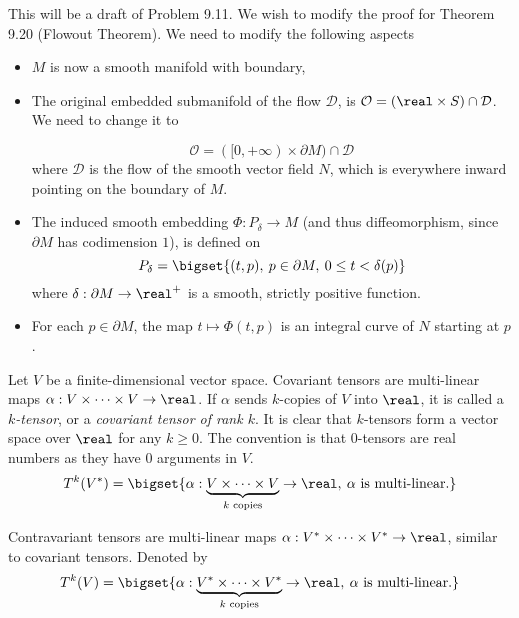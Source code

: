 \documentclass[../main-v2-manifolds.tex]{subfiles}
\begin{document}
This will be a draft of Problem 9.11. We wish to modify the proof for Theorem 9.20 (Flowout Theorem). We need to modify the following aspects
\begin{itemize}
    \item $M$ is now a smooth manifold with boundary,
    \item The original embedded submanifold of the flow $\mathcal{D}$, is $\mathcal{O} = (\real\times S)\cap \mathcal{D}$. We need to change it to

    \[
        \mathcal{O} = ([0,+\infty)\times \partial M)\cap \mathcal{D}
    \]
    where $\mathcal{D}$ is the flow of the smooth vector field $N$, which is everywhere inward pointing on the boundary of $M$.
    \item The induced smooth embedding $\Phi: P_\delta\to M$ (and thus diffeomorphism, since $\partial M$ has codimension $1$), is defined on 
    \[
        P_\delta = \bigset{(t,p),\: p\in\partial M,\: 0\leq t< \delta(p)}
    \]
    where $\delta:\partial M\to \real^+$ is a smooth, strictly positive function.
    \item For each $p\in \partial M$, the map $t\mapsto \Phi(t,p)$ is an integral curve of $N$ starting at $p$. 
\end{itemize}





\begin{definition}
    Let $V$ be a finite-dimensional vector space. Covariant tensors are multi-linear maps $\alpha: V\times \cdots \times V\to \real$. If $\alpha$ sends $k$-copies of $V$ into $\real$, it is called a \emph{$k$-tensor}, or a \emph{covariant tensor of rank $k$}. It is clear that $k$-tensors form a vector space over $\real$ for any $k\geq 0$. The convention is that $0$-tensors are real numbers as they have $0$ arguments in $V$. 
    \[
        T^{k}(V^*) = \bigset{\alpha: \underbrace{V\times\cdots\times V}_{k\text{ copies}}\to\real,\: \alpha\text{ is multi-linear.}}
    \]
\end{definition}

\begin{definition}
    Contravariant tensors are multi-linear maps $\alpha: V^*\times \cdots\times V^*\to \real$, similar to covariant tensors. Denoted by
    \[
        T^{k}(V) = \bigset{\alpha: \underbrace{V^*\times\cdots\times V^*}_{k\text{ copies}}\to\real,\: \alpha\text{ is multi-linear.}}
    \]
\end{definition}
\end{document}
